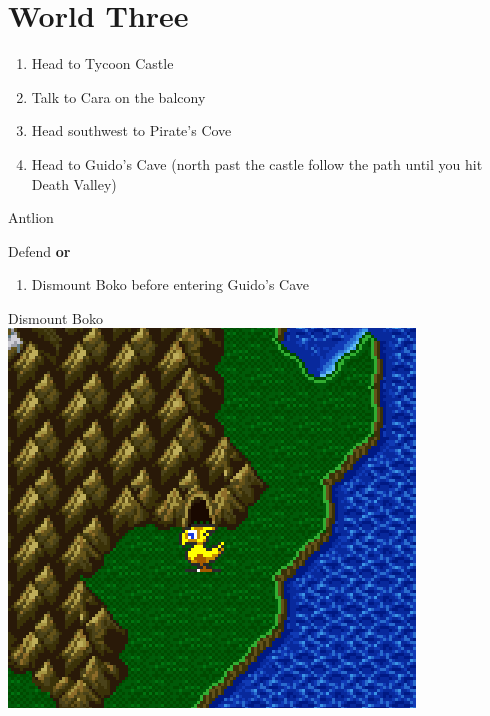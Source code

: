 \chapter{World Three}

\vspace{\baselineskip}

\begin{paracol}{2}

\begin{enumerate}
    \item Head to Tycoon Castle
    \item Talk to Cara on the balcony
    \item Head southwest to Pirate's Cove
    \item Head to Guido's Cave (north past the castle \then follow the path until you hit Death Valley)
\end{enumerate}

\begin{boss}{Antlion}
    \varwb
    \begin{round}{1}
        \cara \leftCommand{\blue} \then \ltwoOld
        \bartz Defend \textbf{or} \hiPotion
    \end{round}
    \begin{round}{1}
        \cara \leftCommand{\blue} \then \lfiveDeath
    \end{round}
    \varwe
\end{boss}

\switchcolumnTwice[*]
\begin{enumerate}[resume]
    \item Dismount Boko before entering Guido's Cave
\end{enumerate}

\switchcolumn
\begin{misc}{Dismount Boko}
    \includegraphics[scale=0.392]{../Graphics/Misc/18. Chocobo Discount.png}
\end{misc}


\end{paracol}
